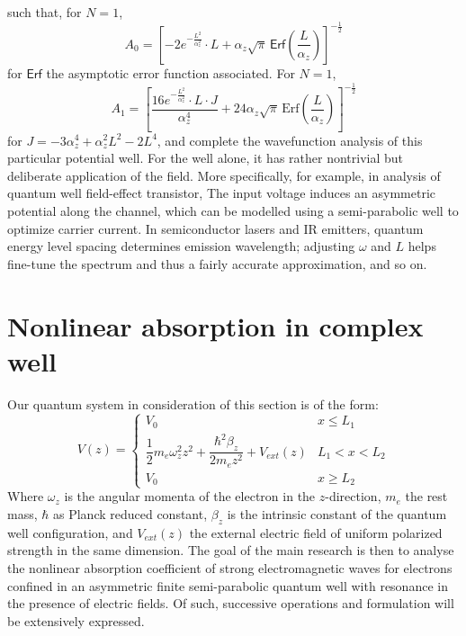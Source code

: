 \documentclass[%
 reprint,
 amsmath,amssymb,
 aps,
]{revtex4-2}
\begin{document}
such that, for $N=1$,
\begin{equation}
    A_0 = \left[ -2 e^{-\frac{L^2}{\alpha_z^2}} \cdot L + \alpha_z \sqrt{\pi} \, \mathsf{Erf}\left( \frac{L}{\alpha_z} \right) \right]^{-\frac{1}{2}}
\end{equation}
for $\mathsf{Erf}$ the asymptotic error function associated. For $N=1$,
\begin{equation}
    A_1 = \left[ \frac{16 e^{-\frac{L^2}{\alpha_z^2}} \cdot L \cdot J}{\alpha_z^4}
+ 24 \alpha_z \sqrt{\pi} \, \text{Erf}\left( \frac{L}{\alpha_z} \right) \right]^{-\frac{1}{2}}
\end{equation}
for $J=-3 \alpha_z^4 + \alpha_z^2 L^2 - 2 L^4$, and complete the wavefunction analysis of this particular potential well. For the well alone, it has rather nontrivial but deliberate application of the field. More specifically, for example, in analysis of quantum well field-effect transistor, The input voltage induces an asymmetric potential along the channel, which can be modelled using a semi-parabolic well to optimize carrier current. In semiconductor lasers and IR emitters, quantum energy level spacing determines emission wavelength; adjusting $\omega$ and $L$ helps fine-tune the spectrum and thus a fairly accurate approximation, and so on. 




\section{Nonlinear absorption in complex well}

Our quantum system in consideration of this section is of the form: 
\begin{equation}\label{eq:quantum_well_main_3}
    V(z)=\begin{cases}
        V_{0} & x \leq L_{1} \\
        \dfrac{1}{2}m_{{e}}\omega_{z}^{2}z^{2}+ \dfrac{\hbar^{2}\beta_{z}}{2m_{e}z^{2}} + V_{ext}(z) & L_{1} < x < L_{2}\\
        V_{0} & x \geq L_{2}
    \end{cases}
\end{equation}
Where $\omega_{z}$ is the angular momenta of the electron in the $z$-direction, $m_{e}$ the rest mass, $\hbar$ as Planck reduced constant, $\beta_{z}$ is the intrinsic constant of the quantum well configuration, and $V_{ext}(z)$ the external electric field of uniform polarized strength in the same dimension. The goal of the main research is then to analyse the nonlinear absorption coefficient of strong electromagnetic waves for electrons confined in an asymmetric finite semi-parabolic quantum well with resonance in the presence of electric fields. Of such, successive operations and formulation will be extensively expressed. 
\end{document}
